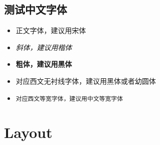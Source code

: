 \documentclass[
        handout,
        ]{beamer}
\begin{document}
\subsection{测试中文字体}
\begin{frame}[t]{\subsecname} %
    \begin{itemize}
    \item \textrm{正文字体，建议用宋体}
    \item \textit{斜体，建议用楷体}
    \item \textbf{粗体，建议用黑体}
    \item \textsf{对应西文无衬线字体，建议用黑体或者幼圆体}
    \item \texttt{对应西文等宽字体，建议用中文等宽字体}
    \end{itemize}
\end{frame}


\section{Layout}
\end{document}
